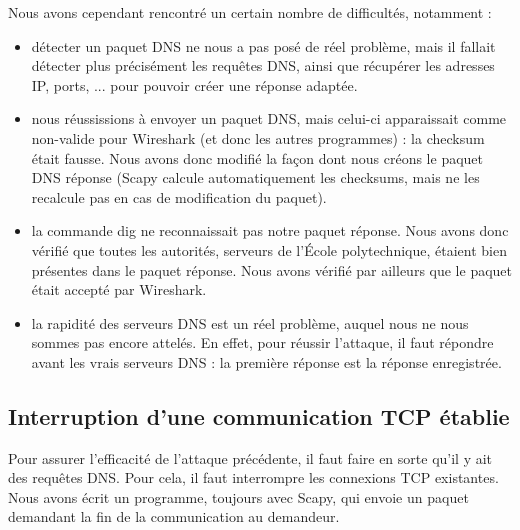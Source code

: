 \documentclass[a4paper, 12pt,twoside]{article}
\begin{document}
	\noindent Nous avons cependant rencontré un certain nombre de difficultés, notamment : \begin{itemize}[label=\color{bleu303}\textbullet{}]
		\item détecter un paquet DNS ne nous a pas posé de réel problème, mais il fallait détecter plus précisément les requêtes DNS, ainsi que récupérer les adresses IP, ports, ... pour pouvoir créer une réponse adaptée.
		\item nous réussissions à envoyer un paquet DNS, mais celui-ci apparaissait comme non-valide pour Wireshark (et donc les autres programmes) : la checksum était fausse. Nous avons donc modifié la façon dont nous créons le paquet DNS réponse (Scapy calcule automatiquement les checksums, mais ne les recalcule pas en cas de modification du paquet).
		\item la commande dig ne reconnaissait pas notre paquet réponse. Nous avons donc vérifié que toutes les autorités, serveurs de l'École polytechnique, étaient bien présentes dans le paquet réponse. Nous avons vérifié par ailleurs que le paquet était accepté par Wireshark. 
		\item la rapidité des serveurs DNS est un réel problème, auquel nous ne nous sommes pas encore attelés. En effet, pour réussir l'attaque, il faut répondre avant les vrais serveurs DNS : la première réponse est la réponse enregistrée.
	\end{itemize}

	\subsection{Interruption d'une communication TCP établie}
	
	Pour assurer l'efficacité de l'attaque précédente, il faut faire en sorte qu'il y ait des requêtes DNS. Pour cela, il faut interrompre les connexions TCP existantes. Nous avons écrit un programme, toujours avec Scapy, qui envoie un paquet demandant la fin de la communication au demandeur.
	
\end{document}
